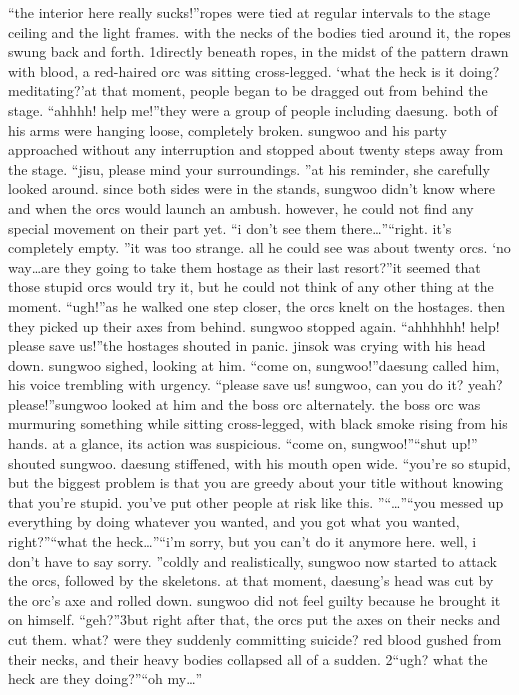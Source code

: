 “the interior here really sucks!”ropes were tied at regular intervals to the stage ceiling and the light frames.
 with the necks of the bodies tied around it, the ropes swung back and forth.
1directly beneath ropes, in the midst of the pattern drawn with blood, a red-haired orc was sitting cross-legged.
‘what the heck is it doing? meditating?’at that moment, people began to be dragged out from behind the stage.
“ahhhh! help me!”they were a group of people including daesung.
 both of his arms were hanging loose, completely broken.
sungwoo and his party approached without any interruption and stopped about twenty steps away from the stage.
“jisu, please mind your surroundings.
”at his reminder, she carefully looked around.
 since both sides were in the stands, sungwoo didn’t know where and when the orcs would launch an ambush.
 however, he could not find any special movement on their part yet.
“i don’t see them there…”“right.
 it’s completely empty.
”it was too strange.
 all he could see was about twenty orcs.
‘no way…are they going to take them hostage as their last resort?”it seemed that those stupid orcs would try it, but he could not think of any other thing at the moment.
“ugh!”as he walked one step closer, the orcs knelt on the hostages.
 then they picked up their axes from behind.
sungwoo stopped again.
“ahhhhhh! help! please save us!”the hostages shouted in panic.
 jinsok was crying with his head down.
sungwoo sighed, looking at him.
“come on, sungwoo!”daesung called him, his voice trembling with urgency.
“please save us! sungwoo, can you do it? yeah? please!”sungwoo looked at him and the boss orc alternately.
 the boss orc was murmuring something while sitting cross-legged, with black smoke rising from his hands.
at a glance, its action was suspicious.
“come on, sungwoo!”“shut up!” shouted sungwoo.
daesung stiffened, with his mouth open wide.
“you’re so stupid, but the biggest problem is that you are greedy about your title without knowing that you’re stupid.
 you’ve put other people at risk like this.
”“…”“you messed up everything by doing whatever you wanted, and you got what you wanted, right?”“what the heck…”“i’m sorry, but you can’t do it anymore here.
 well, i don’t have to say sorry.
”coldly and realistically, sungwoo now started to attack the orcs, followed by the skeletons.
at that moment, daesung’s head was cut by the orc’s axe and rolled down.
 sungwoo did not feel guilty because he brought it on himself.
“geh?”3but right after that, the orcs put the axes on their necks and cut them.
what? were they suddenly committing suicide? red blood gushed from their necks, and their heavy bodies collapsed all of a sudden.
2“ugh? what the heck are they doing?”“oh my…”


